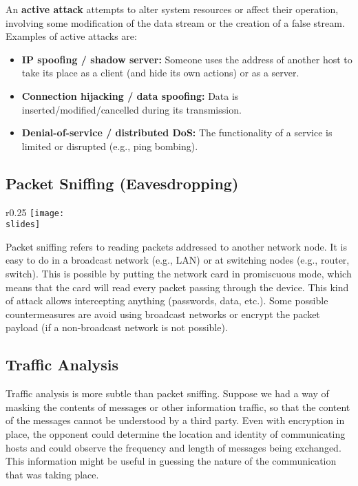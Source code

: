 An \textbf{active attack} attempts to alter system resources or affect their operation, involving some modification of the data stream or the creation of a false stream. Examples of active attacks are:

\begin{itemize}
  \item \textbf{IP spoofing / shadow server:} Someone uses the address of another host to take its place as a client (and hide its own actions) or as a server.
  \item \textbf{Connection hijacking / data spoofing:} Data is inserted/modified/cancelled during its transmission.
  \item \textbf{Denial-of-service / distributed DoS:} The functionality of a service is limited or disrupted (e.g., ping bombing).
\end{itemize}


\subsection{Packet Sniffing (Eavesdropping)}
\begin{wrapfigure}{r}{0.25\textwidth}
  \centering
  \texttt{[image: \\slides]}
\end{wrapfigure}
Packet sniffing refers to reading packets addressed to another network node. It is easy to do in a broadcast network (e.g., LAN) or at switching nodes (e.g., router, switch). This is possible by putting the network card in promiscuous mode, which means that the card will read every packet passing through the device. This kind of attack allows intercepting anything (passwords, data, etc.). Some possible countermeasures are avoid using broadcast networks or encrypt the packet payload (if a non-broadcast network is not possible).


\subsection{Traffic Analysis}
Traffic analysis is more subtle than packet sniffing. Suppose we had a way of masking the contents of messages or other information traffic, so that the content of the messages cannot be understood by a third party. Even with encryption in place, the opponent could determine the location and identity of communicating hosts and could observe the frequency and length of messages being exchanged. This information might be useful in guessing the nature of the communication that was taking place.

